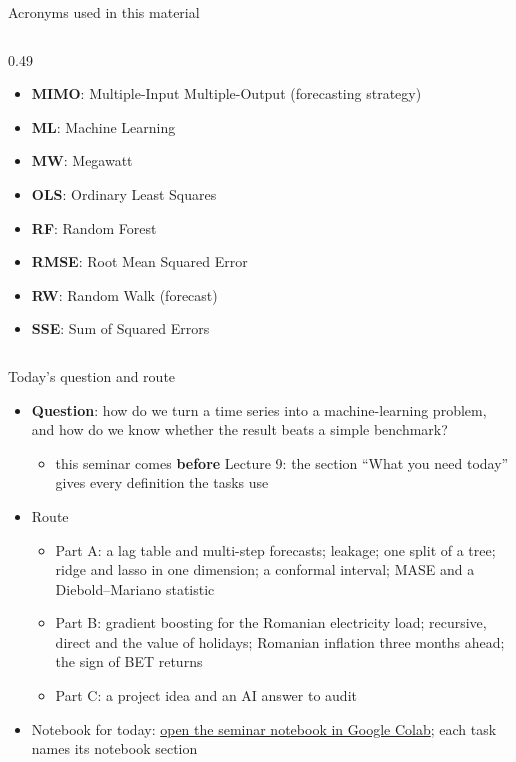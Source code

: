 \begin{frame}{Acronyms used in this material}
\begin{columns}[T]
\begin{column}{0.49\textwidth}
\begin{itemize}
    \item \textbf{MIMO}: Multiple-Input Multiple-Output (forecasting strategy)
    \item \textbf{ML}: Machine Learning
    \item \textbf{MW}: Megawatt
    \item \textbf{OLS}: Ordinary Least Squares
    \item \textbf{RF}: Random Forest
    \item \textbf{RMSE}: Root Mean Squared Error
    \item \textbf{RW}: Random Walk (forecast)
    \item \textbf{SSE}: Sum of Squared Errors
\end{itemize}
\end{column}
\end{columns}
\end{frame}

\begin{frame}{Today's question and route}
\itemsize{\small}
\begin{itemize}
    \item \textbf{Question}: how do we turn a time series into a machine-learning problem, and how do we know whether the result beats a simple benchmark?
    \begin{itemize}
        \item this seminar comes \textbf{before} Lecture 9: the section ``What you need today'' gives every definition the tasks use
    \end{itemize}
    \item Route
    \begin{itemize}
        \item Part A: a lag table and multi-step forecasts; leakage; one split of a tree; ridge and lasso in one dimension; a conformal interval; MASE and a Diebold--Mariano statistic
        \item Part B: gradient boosting for the Romanian electricity load; recursive, direct and the value of holidays; Romanian inflation three months ahead; the sign of BET returns
        \item Part C: a project idea and an AI answer to audit
    \end{itemize}
    \item Notebook for today: \href{\nb}{open the seminar notebook in Google Colab}; each task names its notebook section
\end{itemize}
\end{frame}

